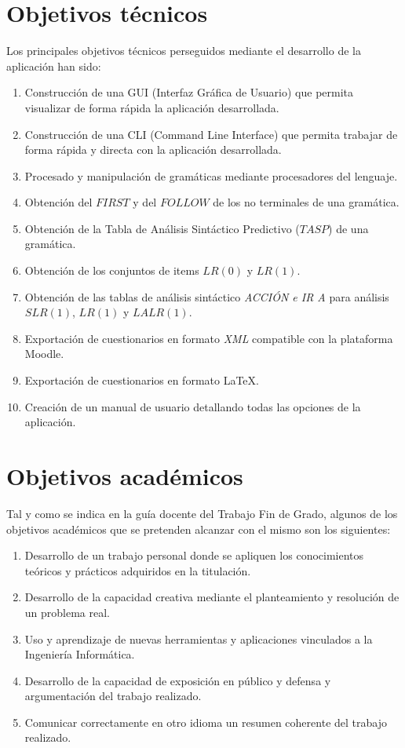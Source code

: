 
\section{Objetivos técnicos}

Los principales objetivos técnicos perseguidos mediante el desarrollo de la aplicación han sido:
\begin{enumerate}
	\item Construcción de una GUI (Interfaz Gráfica de Usuario) que permita visualizar de forma rápida la aplicación desarrollada.
	\item Construcción de una CLI (Command Line Interface) que permita trabajar de forma rápida y directa con la aplicación desarrollada.
	\item Procesado y manipulación de gramáticas mediante procesadores del lenguaje.
	\item Obtención del $FIRST$ y del $FOLLOW$ de los no terminales de una gramática.
	\item Obtención de la Tabla de Análisis Sintáctico Predictivo ($TASP$) de una gramática.
	\item Obtención de los conjuntos de items $LR(0)$ y  $LR(1)$.
	\item Obtención de las tablas de análisis sintáctico  \textit{ACCIÓN e IR A} para análisis $SLR(1)$, $LR(1)$ y $LALR(1)$.
	\item Exportación de cuestionarios en formato \textit{XML} compatible con la plataforma Moodle.
	
	\item Exportación de cuestionarios en formato \LaTeX{}.
	
	\item Creación de un manual de usuario detallando todas las opciones de la aplicación.
\end{enumerate}

\section{Objetivos académicos}
Tal y como se indica en la guía docente del Trabajo Fin de Grado, algunos de los objetivos académicos que se pretenden alcanzar con el mismo son los siguientes:
\begin{enumerate}
	
	\item Desarrollo de un trabajo personal donde se 	apliquen los conocimientos teóricos y prácticos adquiridos en la titulación.
	\item Desarrollo de  la capacidad creativa mediante el planteamiento y resolución de un problema real.
	
	\item Uso y aprendizaje de nuevas herramientas y aplicaciones vinculados a la Ingeniería Informática.

	\item Desarrollo de la capacidad de exposición en público y  defensa y argumentación del trabajo realizado.
	\item Comunicar correctamente en otro idioma un resumen coherente del trabajo realizado.

\end{enumerate}

